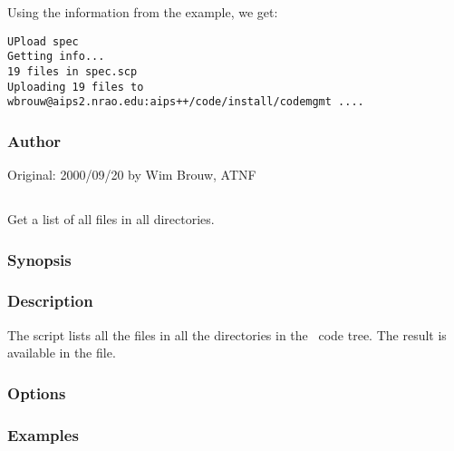 \noindent
Using the information from the  example, we get:

\begin{verbatim}
UPload spec
Getting info...
19 files in spec.scp
Uploading 19 files to wbrouw@aips2.nrao.edu:aips++/code/install/codemgmt ....
\end{verbatim}

\subsubsection*{Author}

Original: 2000/09/20 by Wim Brouw, ATNF


\newpage

\subsection{}
\label{UPtmpl}

Get a list of all files in all  directories.

\subsubsection*{Synopsis}

\begin{synopsis}
\end{synopsis}

\subsubsection*{Description}

\noindent
The  script lists all the files in all the 
directories in the \aipspp\ code tree. The result is available in the
 file.

\subsubsection*{Options}

\subsubsection*{Examples}

